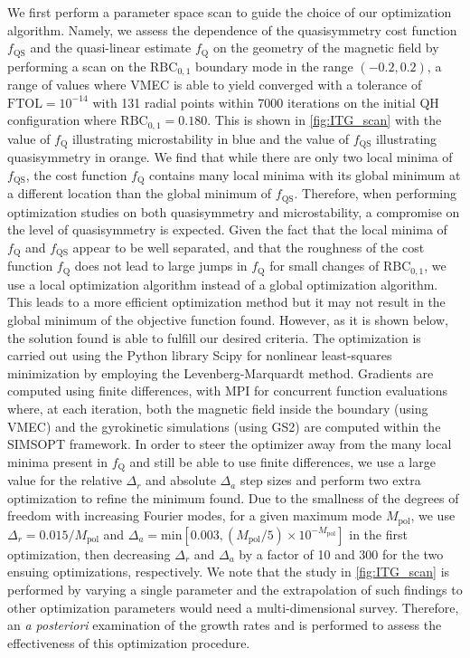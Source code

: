 \documentclass[prl,twocolumn,amsmath,amssymb,showpacs,superscriptaddress]{revtex4-2}
\begin{document}
We first perform a parameter space scan to guide the choice of our optimization algorithm.
%
Namely, we assess the dependence of the quasisymmetry cost function $f_{\text{QS}}$ and the quasi-linear estimate $f_{\text{Q}}$ on the geometry of the magnetic field by performing a scan on the $\mathrm{RBC}_{0,1}$ boundary mode in the range $(-0.2,0.2)${, a range of values where VMEC {is} able to yield converged } {with a tolerance of $\mathrm{FTOL}=10^{-14}$ with 131 radial points within 7000 iterations} on the initial QH configuration where $\mathrm{RBC}_{0,1}=0.180$.
%
This is shown in \cref{fig:ITG_scan} with the value of $f_{\text{Q}}$ illustrating microstability in blue and the value of $f_{\text{QS}}$ illustrating quasisymmetry in orange.
%
We find that while there are only two local minima of $f_{\text{QS}}$, the cost function $f_{\text{Q}}$ contains many local minima with its global minimum at a different location than the global minimum of $f_{\text{QS}}$.
%
Therefore, when performing optimization studies on both quasisymmetry and microstability, a compromise on the level of quasisymmetry is expected.
%
Given the fact that the local minima of $f_{\text{Q}}$ and $f_{\text{QS}}$ appear to be well separated, and that the roughness of the cost function $f_{\text{Q}}$ does not lead to large jumps in $f_{\text{Q}}$ for small changes of $\mathrm{RBC}_{0,1}$, we use a local optimization algorithm instead of a global optimization algorithm.
%
This leads to a more efficient optimization method but it may not result in the global minimum of the objective function found.
%
However, as it is shown below, the solution found is able to fulfill our desired criteria.
%
The optimization is carried out using the Python library Scipy 
\cite{Virtanen2020}
for nonlinear least-squares minimization by employing the Levenberg-Marquardt method.
%
Gradients are computed using finite differences, with MPI for concurrent function evaluations where, at each iteration, both the magnetic field inside the boundary (using VMEC) and the gyrokinetic simulations (using GS2) are computed within the SIMSOPT framework.
%
In order to steer the optimizer away from the many local minima present in $f_{\text{Q}}$ and still be able to use finite differences, we use a large value for the relative $\Delta_r$ and absolute $\Delta_a$ step sizes and perform {two} extra optimization to refine the minimum found.
{
Due to the smallness of the degrees of freedom with increasing Fourier modes, for a given maximum mode $M_{\mathrm{pol}}$, we use $\Delta_r=0.015/M_{\mathrm{pol}}$ and $\Delta_a=$min$[0.003,(M_{\mathrm{pol}}/5)\times10^{-M_{\mathrm{pol}}}]$ in the first optimization, then decreasing $\Delta_r$ and $\Delta_a$ by a factor of 10 and 300 for the two ensuing optimizations, respectively.
}
%
We note that the study in \cref{fig:ITG_scan} is performed by varying a single parameter and the extrapolation of such findings to other optimization parameters would need a multi-dimensional survey.
%
Therefore, an \textit{a posteriori} examination of the growth rates and is performed to assess the effectiveness of this optimization procedure.
\end{document}
